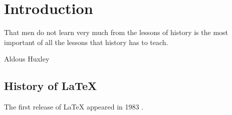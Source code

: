 \section{Introduction}
\label{ch:intro}

\epigraph{That men do not learn very much from the lessons of history is the most important of all the lessons that history has to teach.}{Aldous Huxley}

\subsection{History of \LaTeX}

The first release of \LaTeX \cite{lamport1994latex} appeared in 1983 \cite{lamport2007writings}.

\cleardoublepage